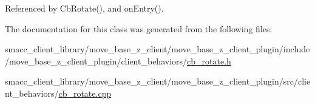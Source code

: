 Referenced by Cb\+Rotate(), and on\+Entry().



The documentation for this class was generated from the following files\+:\begin{DoxyCompactItemize}
\item 
smacc\+\_\+client\+\_\+library/move\+\_\+base\+\_\+z\+\_\+client/move\+\_\+base\+\_\+z\+\_\+client\+\_\+plugin/include/move\+\_\+base\+\_\+z\+\_\+client\+\_\+plugin/client\+\_\+behaviors/\hyperlink{cb__rotate_8h}{cb\+\_\+rotate.\+h}\item 
smacc\+\_\+client\+\_\+library/move\+\_\+base\+\_\+z\+\_\+client/move\+\_\+base\+\_\+z\+\_\+client\+\_\+plugin/src/client\+\_\+behaviors/\hyperlink{cb__rotate_8cpp}{cb\+\_\+rotate.\+cpp}\end{DoxyCompactItemize}
